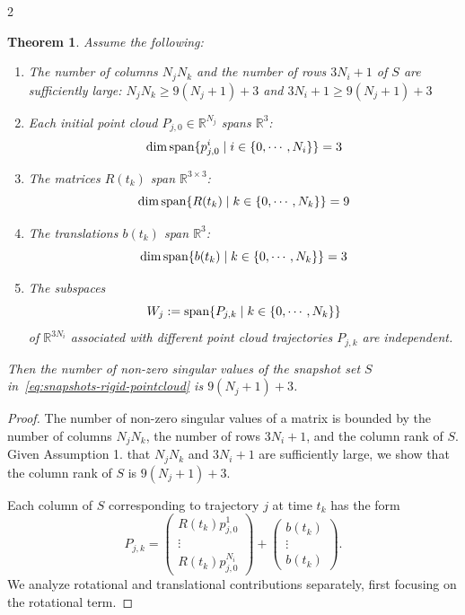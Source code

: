 \documentclass{article}
\newtheorem{theorem}{Theorem}[section]
\newtheorem{proof}{Proof}[theorem]
\newcommand{\R}{\mathbb{R}}                                 %
\begin{document}
\begin{multicols}{2}
\begin{theorem}
    Assume the following:
    \begin{enumerate}
        \item The number of columns $N_jN_k$ and the number of rows $3N_i+1$ of $S$ are sufficiently large: $N_jN_k \geq 9(N_j+1)+3$ and $3N_i+1 \geq 9(N_j+1)+3$
        \item Each initial point cloud $P_{j,0} \in \R^{N_j}$ spans $\R^3$: $$\dim\textnormal{span}\{p^i_{j,0}\;|\;i \in \{0,\cdots,N_i\}\} = 3$$
        \item The matrices $R(t_k)$ span $\R^{3\times 3}$: $$\dim\textnormal{span}\{R(t_k)\;|\;k \in \{0,\cdots,N_k\}\} = 9$$
        \item The translations $b(t_k)$ span $\R^3$: $$\dim\textnormal{span}\{b(t_k)\;|\;k \in \{0,\cdots,N_k\}\} = 3$$
        \item The subspaces $$W_j := \textnormal{span}\{P_{j,k}\;|\; k \in \{0,\cdots,N_k\} \}$$ of $\R^{3N_i}$ associated with different point cloud trajectories $P_{j,k}$ are independent. 
    \end{enumerate}  
    Then the number of non-zero singular values of the snapshot set $S$ in~\eqref{eq:snapshots-rigid-pointcloud} is $9(N_j+1)+3$.
\end{theorem}

\begin{proof}
    The number of non-zero singular values of a matrix is bounded by the number of columns $N_jN_k$, the number of rows $3N_i+1$, and the column rank of $S$. Given Assumption 1. that $N_jN_k$ and $3N_i+1$ are sufficiently large, we show that the column rank of $S$ is $9(N_j+1)+3$.
    
    Each column of $S$ corresponding to trajectory $j$ at time $t_k$ has the form
    \begin{equation}
    P_{j,k}     =
    \begin{pmatrix}
    R(t_k)p^1_{j,0} \\ 
    \vdots \\
    R(t_k)p^{N_i}_{j,0}
    \end{pmatrix}
    +
    \begin{pmatrix}
    b(t_k) \\
    \vdots \\
    b(t_k)
    \end{pmatrix}.
    \end{equation}
    We analyze rotational and translational contributions separately, first focusing on the rotational term.


\end{proof}
\end{multicols}
\end{document}
